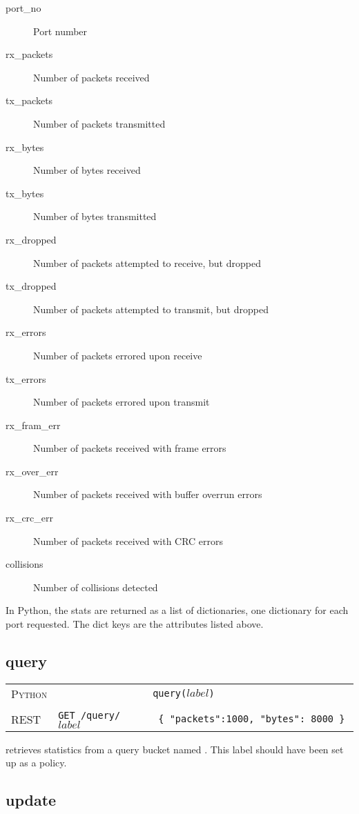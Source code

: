 \begin{description}
\item[port\_no] Port number  
\item[rx\_packets] Number of packets received  
\item[tx\_packets] Number of packets transmitted  
\item[rx\_bytes] Number of bytes received  
\item[tx\_bytes] Number of bytes transmitted  
\item[rx\_dropped] Number of packets attempted to receive, but dropped  
\item[tx\_dropped] Number of packets attempted to transmit, but dropped
\item[rx\_errors] Number of packets errored upon receive 
\item[tx\_errors] Number of packets errored upon transmit
\item[rx\_fram\_err] Number of packets received with frame errors
\item[rx\_over\_err] Number of packets received with buffer overrun errors
\item[rx\_crc\_err] Number of packets received with CRC errors
\item[collisions] Number of collisions detected
\end{description}

In Python, the stats are returned as a list of dictionaries, one dictionary for each port requested.  The dict 
keys are the attributes listed above.

\subsection{query}

\bigskip
\begin{tabularx}{\linewidth}{llX}
\textsc{Python} &  & \texttt{query($label$)} \\ \\
\textsc{REST} & \texttt{GET /query/$label$} & 
  \texttt{ \{ "packets":1000, "bytes": 8000 \} } 
\end{tabularx}

 retrieves statistics from a query bucket named .  This label should have
been set up as a  policy.

\subsection{update}

